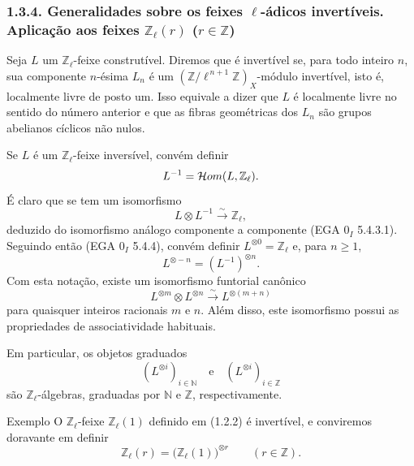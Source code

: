 \subsubsection*{1.3.4. Generalidades sobre os feixes \(\ell\)-ádicos invertíveis. Aplicação aos feixes \(\mathbb Z_\ell(r)\) (\(r\in\mathbb Z\))}

Seja \(L\) um \(\mathbb Z_\ell\)-feixe construtível. Diremos que é invertível se, para todo inteiro \(n\), sua componente \(n\)-ésima \(L_n\) é um \((\mathbb Z/\ell^{\,n+1}\mathbb Z)_X\)-módulo invertível, isto é, localmente livre de posto um. Isso equivale a dizer que \(L\) é localmente livre no sentido do número anterior e que as fibras geométricas dos \(L_n\) são grupos abelianos cíclicos não nulos.

Se \(L\) é um \(\mathbb Z_\ell\)-feixe inversível, convém definir
\[
L^{-1}=\mathcal{H}om(L,\mathbb Z_\ell).
\]
É claro que se tem um isomorfismo
\[
L\otimes L^{-1}\xrightarrow{\sim}\mathbb Z_\ell,
\]
deduzido do isomorfismo análogo componente a componente (EGA \(0_I\) 5.4.3.1). Seguindo então (EGA \(0_I\) 5.4.4), convém definir \(L^{\otimes0}=\mathbb Z_\ell\) e, para \(n\ge1\),
\[
L^{\otimes -n}=(L^{-1})^{\otimes n}.
\]
Com esta notação, existe um isomorfismo funtorial canônico
\[
L^{\otimes m}\otimes L^{\otimes n}\xrightarrow{\sim}L^{\otimes(m+n)}
\]
para quaisquer inteiros racionais \(m\) e \(n\). Além disso, este isomorfismo possui as propriedades de associatividade habituais.

Em particular, os objetos graduados
\[
(L^{\otimes i})_{i\in\mathbb N}\quad\text{e}\quad(L^{\otimes i})_{i\in\mathbb Z}
\]
são \(\mathbb Z_\ell\)-álgebras, graduadas por \(\mathbb N\) e \(\mathbb Z\), respectivamente.

\begin{statement}{Exemplo}
O \(\mathbb Z_\ell\)-feixe \(\mathbb Z_\ell(1)\) definido em (1.2.2) é invertível, e conviremos doravante em definir
\[
\mathbb Z_\ell(r)=\bigl(\mathbb Z_\ell(1)\bigr)^{\otimes r}\qquad (r\in\mathbb Z).
\]
\end{statement}

